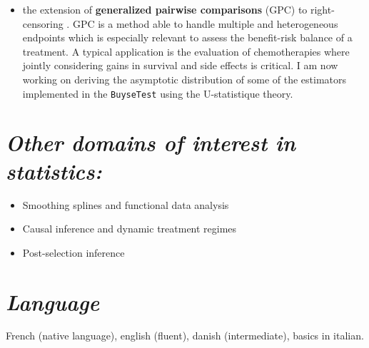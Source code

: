 \documentclass[12pt]{article}
\begin{document}
\clearpage

\begin{itemize}
\item the extension of \textbf{generalized pairwise comparisons} (GPC) to
right-censoring \citep{peron2016extension}. GPC is a method able to
handle multiple and heterogeneous endpoints which is especially
relevant to assess the benefit-risk balance of a treatment. A
typical application is the evaluation of chemotherapies where
jointly considering gains in survival and side effects is
critical. I am now working on deriving the asymptotic distribution
of some of the estimators implemented in the \texttt{BuyseTest} using the
U-statistique theory.
\end{itemize}

\section*{\emph{Other domains of interest in statistics:}}
\label{sec:org1e43a0b}
\begin{itemize}
\item Smoothing splines and functional data analysis
\item Causal inference and dynamic treatment regimes
\item Post-selection inference
\end{itemize}


\section*{\emph{Language}}
\label{sec:org98f5289}
French (native language), english (fluent), danish (intermediate),
basics in italian.
\end{document}
